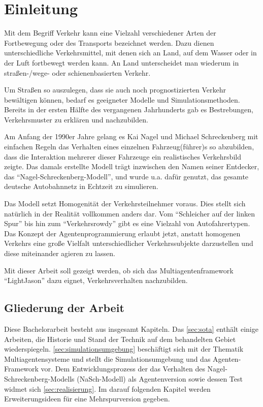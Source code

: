 \section{Einleitung}
\label{sec:einleitung}

Mit dem Begriff Verkehr kann eine Vielzahl verschiedener Arten der Fortbewegung oder des Transports bezeichnet werden. 
Dazu dienen unterschiedliche Verkehrsmittel, mit denen sich an Land, auf dem Wasser oder in der Luft fortbewegt werden kann.
An Land unterscheidet man wiederum in \mbox{straßen-/}wege- oder schienenbasierten Verkehr.

Um Straßen so auszulegen, dass sie auch noch prognostizierten Verkehr bewältigen können, bedarf es geeigneter Modelle und Simulationsmethoden.
Bereits in der ersten Hälfte des  vergangenen Jahrhunderts gab es Bestrebungen, Verkehrsmuster zu erklären und nachzubilden.

Am Anfang der 1990er Jahre gelang es Kai Nagel und Michael Schreckenberg mit einfachen Regeln das Verhalten eines einzelnen Fahrzeug(führer)s so abzubilden, dass die Interaktion mehrerer dieser Fahrzeuge ein realistisches Verkehrsbild zeigte.
Das damals erstellte Modell trägt inzwischen den Namen seiner Entdecker, das \enquote{Nagel-Schreckenberg-Modell}, und wurde u.a. dafür genutzt, das gesamte deutsche Autobahnnetz in Echtzeit zu simulieren.

Das Modell setzt Homogenität der Verkehrsteilnehmer voraus. 
Dies stellt sich natürlich in der Realität vollkommen anders dar.
Vom \enquote{Schleicher auf der linken Spur} bis hin zum \enquote{Verkehrsrowdy} gibt es eine Vielzahl von Autofahrertypen.
Das Konzept der Agentenprogrammierung erlaubt jetzt, anstatt homogenen Verkehrs eine große Vielfalt unterschiedlicher Verkehrssubjekte darzustellen und diese miteinander agieren zu lassen.

Mit dieser Arbeit soll gezeigt werden, ob sich das Multiagentenframework \enquote{LightJason} dazu eignet, Verkehrsverhalten nachzubilden.



\subsection{Gliederung der Arbeit}
\label{sec:gliederung}

Diese Bachelorarbeit besteht aus insgesamt  Kapiteln.
Das \cref{sec:sota} enthält einige Arbeiten, die Historie und Stand der Technik auf dem behandelten Gebiet wiederspiegeln.
\cref{sec:simulationsumgebung} beschäftigt sich mit der Thematik Multiagentensysteme und stellt die Simulationsumgebung und das Agenten-Framework vor.
Dem Entwicklungsprozess der das Verhalten des Nagel-Schreckenberg-Modells (NaSch-Modell) als Agentenversion sowie dessen Test widmet sich \cref{sec:realisierung}.
Im darauf folgenden Kapitel werden Erweiterungsideen für eine Mehrspurversion gegeben.

